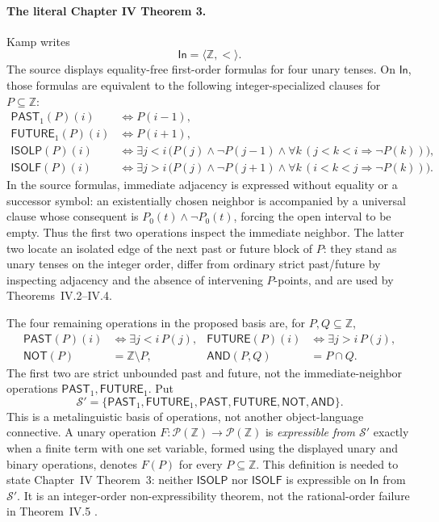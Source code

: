 \paragraph{The literal Chapter IV Theorem 3.}
Kamp writes
\[
 \mathsf{In}=\langle\mathbb Z,<\rangle.
\]
The source displays equality-free first-order formulas for four unary tenses.
On \(\mathsf{In}\), those formulas are equivalent to the following
integer-specialized clauses for \(P\subseteq\mathbb Z\):
\[
\begin{aligned}
 \mathsf{PAST}_1(P)(i)
 &\Longleftrightarrow P(i-1),\\
 \mathsf{FUTURE}_1(P)(i)
 &\Longleftrightarrow P(i+1),\\
 \mathsf{ISOLP}(P)(i)
 &\Longleftrightarrow
 \exists j<i\,
 \bigl(P(j)\land\neg P(j-1)\land
       \forall k\,(j<k<i\Rightarrow\neg P(k))\bigr),\\
 \mathsf{ISOLF}(P)(i)
 &\Longleftrightarrow
 \exists j>i\,
 \bigl(P(j)\land\neg P(j+1)\land
       \forall k\,(i<k<j\Rightarrow\neg P(k))\bigr).
\end{aligned}
\]
In the source formulas, immediate adjacency is expressed without equality or
a successor symbol: an existentially chosen neighbor is accompanied by a
universal clause whose consequent is \(P_0(t)\land\neg P_0(t)\), forcing the
open interval to be empty.  Thus the first two operations inspect the
immediate neighbor.  The latter two
locate an isolated edge of the next past or future block of \(P\): they stand
as unary tenses on the integer order, differ from ordinary strict
past/future by inspecting adjacency and the absence of intervening \(P\)-points,
and are used by Theorems~IV.2--IV.4.

The four remaining operations in the proposed basis are, for
\(P,Q\subseteq\mathbb Z\),
\[
\begin{aligned}
 \mathsf{PAST}(P)(i)&\Longleftrightarrow \exists j<i\,P(j),&
 \mathsf{FUTURE}(P)(i)&\Longleftrightarrow \exists j>i\,P(j),\\
 \mathsf{NOT}(P)&=\mathbb Z\setminus P,&
 \mathsf{AND}(P,Q)&=P\cap Q.
\end{aligned}
\]
The first two are strict unbounded past and future, not the immediate-neighbor
operations \(\mathsf{PAST}_1,\mathsf{FUTURE}_1\).  Put
\[
 \mathcal S'
 =
 \{\mathsf{PAST}_1,\mathsf{FUTURE}_1,
   \mathsf{PAST},\mathsf{FUTURE},
   \mathsf{NOT},\mathsf{AND}\}.
\]
This is a metalinguistic basis of operations, not another object-language
connective.  A unary operation \(F:\mathcal P(\mathbb Z)\to
\mathcal P(\mathbb Z)\) is \emph{expressible from \(\mathcal S'\)} exactly
when a finite term with one set variable, formed using the displayed unary
and binary operations, denotes \(F(P)\) for every
\(P\subseteq\mathbb Z\).  This definition is needed to state Chapter~IV
Theorem~3: neither \(\mathsf{ISOLP}\) nor \(\mathsf{ISOLF}\) is expressible on
\(\mathsf{In}\) from \(\mathcal S'\).  It is an integer-order
non-expressibility theorem, not the rational-order failure in Theorem~IV.5
\cite[ch.~IV, pp.~100--108]{Kamp1968}.

